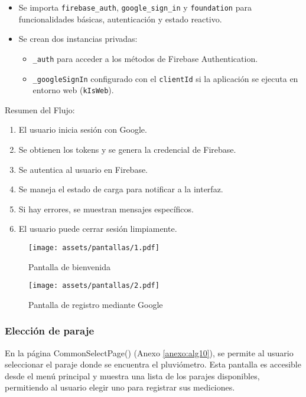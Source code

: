 \begin{itemize}
    \item Se importa \texttt{firebase\_auth}, \texttt{google\_sign\_in} y \texttt{foundation} para funcionalidades básicas, autenticación y estado reactivo.
    \item Se crean dos instancias privadas:
    \begin{itemize}
        \item \texttt{\_auth} para acceder a los métodos de Firebase Authentication.
        \item \texttt{\_googleSignIn} configurado con el \texttt{clientId} si la aplicación se ejecuta en entorno web (\texttt{kIsWeb}).
    \end{itemize}
\end{itemize}


Resumen del Flujo:

\begin{enumerate}
    \item El usuario inicia sesión con Google.
    \item Se obtienen los tokens y se genera la credencial de Firebase.
    \item Se autentica al usuario en Firebase.
    \item Se maneja el estado de carga para notificar a la interfaz.
    \item Si hay errores, se muestran mensajes específicos.
    \item El usuario puede cerrar sesión limpiamente.
\end{enumerate}

\begin{figure}[h!]
\centering
  \texttt{[image: assets/pantallas/1.pdf]}
  \caption{Pantalla de bienvenida}
  \label{pantallas1}
\end{figure}

\begin{figure}[h!]
\centering
  \texttt{[image: assets/pantallas/2.pdf]}
  \caption{Pantalla de registro mediante Google}
  \label{pantallas2}
\end{figure}
\newpage
\subsubsection{Elección de paraje}


En la página CommonSelectPage() (Anexo \ref{anexo:alg10}), se permite al usuario seleccionar el paraje donde se encuentra el pluviómetro. Esta pantalla es accesible desde el menú principal y muestra una lista de los parajes disponibles, permitiendo al usuario elegir uno para registrar sus mediciones.


